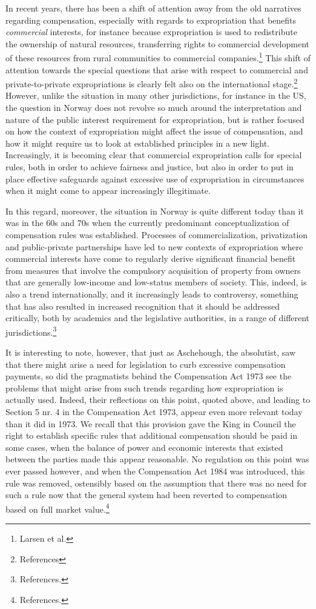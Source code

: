 \documentclass[10pt]{article} %
\begin{document}
In recent years, there has been a shift of attention away from the old narratives regarding compensation, especially with regards to expropriation that benefits \emph{commercial} interests, for instance because expropriation is used to redistribute the ownership of natural resources, transferring rights to commercial development of these resources from rural communities to commercial companies.\footnote{Larsen et al.} This shift of attention towards the special questions that arise with respect to commercial and private-to-private expropriations is clearly felt also on the international stage.\footnote{References} However, unlike the situation in many other jurisdictions, for instance in the US, the question in Norway does not revolve so much around the interpretation and nature of the public interest requirement for expropriation, but is rather focused on how the context of expropriation might affect the issue of compensation, and how it might require us to look at established principles in a new light. Increasingly, it is becoming clear that commercial expropriation calls for special rules, both in order to achieve fairness and justice, but also in order to put in place effective safeguards against excessive use of expropriation in circumstances when it might come to appear increasingly illegitimate.

In this regard, moreover, the situation in Norway is quite different today than it was in the 60s and 70s when the currently predominant conceptualization of compensation rules was established. Processes of commercialization, privatization and public-private partnerships have led to new contexts of expropriation where commercial interests have come to regularly derive significant financial benefit from measures that involve the compulsory acquisition of property from owners that are generally low-income and low-status members of society. This, indeed, is also a trend internationally, and it increasingly leads to controversy, something that has also resulted in increased recognition that it should be addressed critically, both by academics and the legislative authorities, in a range of different jurisdictions.\footnote{References.}

It is interesting to note, however, that just as Aschehough, the absolutist, saw that there might arise a need for legislation to curb excessive compensation payments, so did the pragmatists behind the Compensation Act 1973 see the problems that might arise from such trends regarding how expropriation is actually used. Indeed, their reflections on this point, quoted above, and leading to Section 5 nr. 4 in the Compensation Act 1973, appear even more relevant today than it did in 1973. We recall that this provision gave the King in Council the right to establish specific rules that additional compensation should be paid in some cases, when the balance of power and economic interests that existed between the parties made this appear reasonable. No regulation on this point was ever passed however, and when the Compensation Act 1984 was introduced, this rule was removed, ostensibly based on the assumption that there was no need for such a rule now that the general system had been reverted to compensation based on full market value.\footnote{References.}
\end{document}
